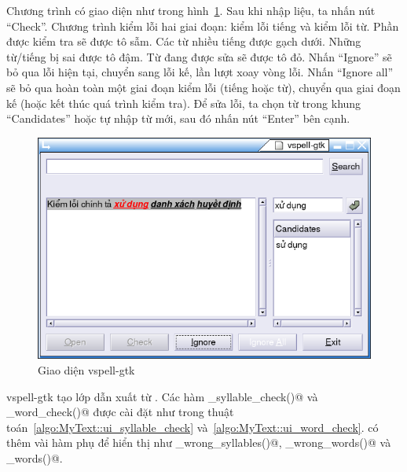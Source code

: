\documentclass[a4paper,oneside,14pt]{extbook} %
\begin{document}
Chương trình có giao diện như trong
hình~\ref{fig:vspell-gtk-ui}. Sau khi nhập liệu, ta nhấn nút
``Check''. Chương trình kiểm lỗi hai giai đoạn: kiểm lỗi tiếng và kiểm
lỗi từ. Phần được kiểm tra sẽ được tô sẫm. Các từ nhiều tiếng được
gạch dưới. Những từ/tiếng bị sai được
tô đậm. Từ đang được sửa sẽ được tô đỏ. Nhấn ``Ignore'' sẽ bỏ qua
lỗi hiện tại, chuyển sang lỗi kế, lần lượt xoay vòng lỗi. Nhấn
``Ignore all'' sẽ bỏ qua hoàn toàn một giai đoạn kiểm lỗi (tiếng hoặc
từ), chuyển qua giai đoạn kế (hoặc kết thúc quá trình kiểm tra). Để
sửa lỗi, ta chọn từ trong khung ``Candidates'' hoặc tự nhập từ mới,
sau đó nhấn nút ``Enter'' bên cạnh.
\begin{figure}[htbp]
  \centering
  \includegraphics[width=\textwidth]{vspell-gtk}
  \caption{Giao diện vspell-gtk}
  \label{fig:vspell-gtk-ui}
\end{figure}

vspell-gtk tạo lớp \verb@MyText@ dẫn xuất từ \verb@Text@. Các hàm
\verb@ui_syllable_check()@ và \verb@ui_word_check()@ được cài đặt như
trong thuật toán~\ref{algo:MyText::ui_syllable_check}
và~\ref{algo:MyText::ui_word_check}. \verb@MyText@ có thêm vài hàm phụ
để hiển thị như \verb@show_wrong_syllables()@,
\verb@show_wrong_words()@ và \verb@show_words()@.
\end{document}
